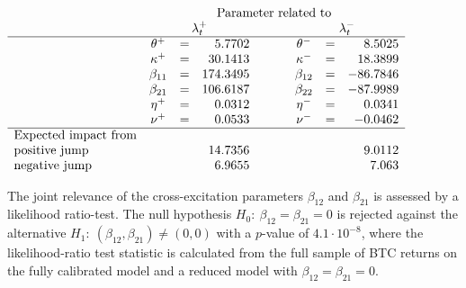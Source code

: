\documentclass[11pt,a4paper]{article}
\numberwithin{equation}{section}
\theoremstyle{remark}
\theoremstyle{definition}
\begin{document}
\begin{table}[t]
    \centering
\arraycolsep=1.4pt
$\begin{array}{lccrcccr}
      &   \multicolumn{7}{c}{\text{Parameter related to}}\\
    &\multicolumn{3}{c}{\lambda_t^+} &\phantom{\text{test}} & \multicolumn{3}{c}{\lambda_t^-} \\\hline
&\theta^+&=&5.7702 && \theta^-&=&8.5025\\
&\kappa^+&=&30.1413&& \kappa^-&=&18.3899\\
&\beta_{11}&=&174.3495 && \beta_{12}&=&-86.7846\\
&\beta_{21}&=&106.6187&& \beta_{22}&=&-87.9989\\
&\eta^+&=&0.0312&& \eta^-&=&0.0341\\
&\nu^+&=&0.0533&& \nu^-&=&-0.0462\\\hline
\text{Expected impact from}\\
\text{positive jump} &&& 14.7356 &&&& 9.0112\\
\text{negative jump} &&& 6.9655 &&&& 7.063\\
\end{array}
$
    \caption{Calibrated parameters of the jump intensities under $\mathbb P$.}
    \label{tab:calibrated}
\end{table}

The joint relevance of the cross-excitation parameters $\beta_{12}$ and $\beta_{21}$ is assessed by a likelihood ratio-test. The null hypothesis $H_0:\ \beta_{12}=\beta_{21}=0$ is rejected against the alternative $H_1:\ (\beta_{12},\beta_{21}) \neq (0,0)$ with a $p$-value of $4.1\cdot 10^{-8}$, where the likelihood-ratio test statistic is calculated from the full sample of BTC returns on the fully calibrated model and a reduced model with $\beta_{12}=\beta_{21}=0$.
\end{document}
